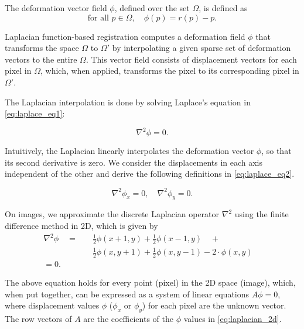 \documentclass[lettersize,journal]{IEEEtran}
\begin{document}
The deformation vector field $\phi$, defined over the set $\Omega$, is defined as 
\begin{equation} \label{eq:dvf_definition}
    \text{for all } p \in \Omega, \quad \phi(p)=r(p)-p.
\end{equation}

Laplacian function-based registration \cite{RegBoost2025} computes a deformation field $\phi$ that transforms the space $\Omega$ to $\Omega'$ by interpolating a given sparse set of deformation vectors to the entire $\Omega$. This vector field consists of displacement vectors for each pixel in $\Omega$, which, when applied, transforms the pixel to its corresponding pixel in $\Omega'$. 

The Laplacian interpolation is done by solving Laplace's equation in \autoref{eq:laplace_eq1}:

\begin{equation} \label{eq:laplace_eq1}
\nabla^2 \phi = 0.
\end{equation}

Intuitively, the Laplacian linearly interpolates the deformation vector $\phi$, so that its second derivative is zero. We consider the displacements in each axis independent of the other and derive the following definitions in \autoref{eq:laplace_eq2}. 

\begin{equation} \label{eq:laplace_eq2}
\nabla^2 \phi_x = 0, \quad \nabla^2 \phi_y = 0.
\end{equation}

On images, we approximate the discrete Laplacian operator $\nabla^2$ using the finite difference method in 2D, which is given by 
\begin{equation} 
    \begin{split} \label{eq:laplacian_2d}
    \nabla^2 \phi \quad = \quad & \frac{1}{2}\phi(x + 1, y)+ \frac{1}{2} \phi(x - 1, y)\quad+\\ 
    & \frac{1}{2}\phi(x, y + 1) + \frac{1}{2}\phi(x, y - 1) - 2\cdot\phi(x, y) \quad \\
    = 0.
    \end{split} 
\end{equation}

The above equation holds for every point (pixel) in the 2D space (image), which, when put together, can be expressed as a system of linear equations $A\phi=0$, where displacement values $\phi$ ($\phi_x$ or $\phi_y$) for each pixel are the unknown vector. The row vectors of $A$ are the coefficients of the $\phi$ values in \autoref{eq:laplacian_2d}. 
\end{document}
